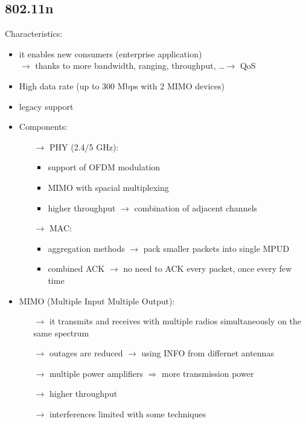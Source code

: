 \subsection{802.11n}
Characteristics:
\begin{itemize}
    \item it enables new consumers (enterprise application)\\
    $\rightarrow$ thanks to more bandwidth, ranging, throughput, \dots $\rightarrow$ QoS
    \item High data rate (up to 300 Mbps with 2 MIMO devices)
    \item legacy support
    \item Components:
    \begin{itemize}
        \item[$\rightarrow$] PHY (2.4/5 GHz):
        \begin{itemize}
            \item support of OFDM modulation
            \item MIMO with spacial multiplexing
            \item higher throughput $\rightarrow$ combination of adjacent channels
        \end{itemize}
        \item[$\rightarrow$] MAC:
        \begin{itemize}
            \item aggregation methods $\rightarrow$ pack smaller packets into single MPUD
            \item combined ACK $\rightarrow$ no need to ACK every packet, once every few time
        \end{itemize}
    \end{itemize}
    \item MIMO (Multiple Input Multiple Output):
    \begin{itemize}
        \item[$\rightarrow$] it transmits and receives with multiple radios simultaneously on the\\same spectrum
        \item[$\rightarrow$] outages are reduced $\rightarrow$ using INFO from differnet antennas
        \item[$\rightarrow$] multiple power amplifiers $\Rightarrow$ more transmission power
        \item[$\rightarrow$] higher throughput
        \item[$\rightarrow$] interferences limited with some techniques 

\end{itemize}
\end{itemize}
